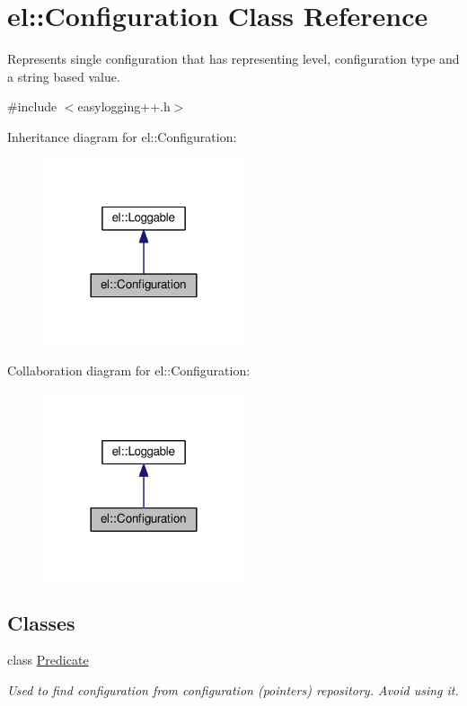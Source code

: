 \hypertarget{classel_1_1_configuration}{}\section{el\+:\+:Configuration Class Reference}
\label{classel_1_1_configuration}


Represents single configuration that has representing level, configuration type and a string based value.  




{\ttfamily \#include $<$easylogging++.\+h$>$}



Inheritance diagram for el\+:\+:Configuration\+:
\nopagebreak
\begin{figure}[H]
\begin{center}
\leavevmode
\includegraphics[width=168pt]{classel_1_1_configuration__inherit__graph}
\end{center}
\end{figure}


Collaboration diagram for el\+:\+:Configuration\+:
\nopagebreak
\begin{figure}[H]
\begin{center}
\leavevmode
\includegraphics[width=168pt]{classel_1_1_configuration__coll__graph}
\end{center}
\end{figure}
\subsection*{Classes}
\begin{DoxyCompactItemize}
\item 
class \hyperlink{classel_1_1_configuration_1_1_predicate}{Predicate}
\begin{DoxyCompactList}\small\item\em Used to find configuration from configuration (pointers) repository. Avoid using it. \end{DoxyCompactList}\end{DoxyCompactItemize}
